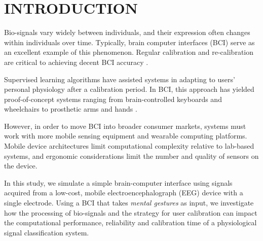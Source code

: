 \section{\uppercase{Introduction}}
\label{sec:introduction}

\noindent Bio-signals vary widely between individuals, and their expression often changes within individuals over time. Typically, brain computer interfaces (BCI) serve as an excellent example of this phenomenon. Regular calibration and re-calibration are critical to achieving decent BCI accuracy \cite{dornhege_toward_2007,mcfarland_brain-computer_2011}.

Supervised learning algorithms have assisted systems in adapting to users' personal physiology after a calibration period. In BCI, this approach has yielded proof-of-concept systems ranging from brain-controlled keyboards and wheelchairs to prosthetic arms and hands \cite{blankertz_note_2007,millan_combining_2010,d._mattia_brain_2011,hill_practical_2014,campbell_neurophone:_2010}. 



However, in order to move BCI into broader consumer markets, systems must work with more mobile sensing equipment and wearable computing platforms. Mobile device architectures limit computational complexity relative to lab-based systems, and ergonomic considerations limit the number and quality of sensors on the device. 


In this study, we simulate a simple brain-computer interface using signals acquired from a low-cost, mobile electroencephalograph (EEG) device with a single electrode. Using a BCI that takes \textit{mental gestures} as input, we investigate how the processing of bio-signals and the strategy for user calibration can impact the computational performance, reliability and calibration time of a physiological signal classification system. 

